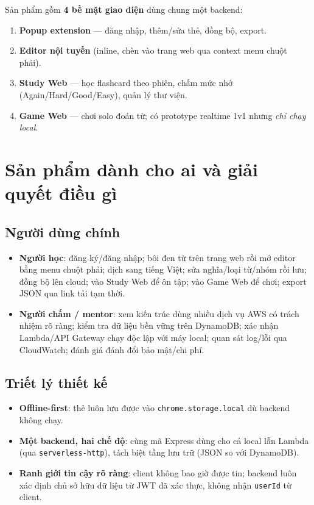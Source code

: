 \documentclass[11pt,a4paper]{article}
\newcommand{\code}[1]{\texttt{#1}}
\begin{document}
\noindent Sản phẩm gồm \textbf{4 bề mặt giao diện} dùng chung một backend:

\begin{enumerate}
  \item \textbf{Popup extension} — đăng nhập, thêm/sửa thẻ, đồng bộ, export.
  \item \textbf{Editor nội tuyến} (inline, chèn vào trang web qua context menu chuột phải).
  \item \textbf{Study Web} — học flashcard theo phiên, chấm mức nhớ (Again/Hard/Good/Easy), quản lý thư viện.
  \item \textbf{Game Web} — chơi solo đoán từ; có prototype realtime 1v1 nhưng \emph{chỉ chạy local}.
\end{enumerate}

\section{Sản phẩm dành cho ai và giải quyết điều gì}

\subsection{Người dùng chính}
\begin{itemize}
  \item \textbf{Người học}: đăng ký/đăng nhập; bôi đen từ trên trang web rồi mở editor bằng
        menu chuột phải; dịch sang tiếng Việt; sửa nghĩa/loại từ/nhóm rồi lưu; đồng bộ lên
        cloud; vào Study Web để ôn tập; vào Game Web để chơi; export JSON qua link tải tạm thời.
  \item \textbf{Người chấm / mentor}: xem kiến trúc dùng nhiều dịch vụ AWS có trách nhiệm rõ ràng;
        kiểm tra dữ liệu bền vững trên DynamoDB; xác nhận Lambda/API Gateway chạy độc lập với máy
        local; quan sát log/lỗi qua CloudWatch; đánh giá đánh đổi bảo mật/chi phí.
\end{itemize}

\subsection{Triết lý thiết kế}
\begin{itemize}
  \item \textbf{Offline-first}: thẻ luôn lưu được vào \code{chrome.storage.local} dù backend không chạy.
  \item \textbf{Một backend, hai chế độ}: cùng mã Express dùng cho cả local lẫn Lambda
        (qua \code{serverless-http}), tách biệt tầng lưu trữ (JSON so với DynamoDB).
  \item \textbf{Ranh giới tin cậy rõ ràng}: client không bao giờ được tin; backend luôn xác định
        chủ sở hữu dữ liệu từ JWT đã xác thực, không nhận \code{userId} từ client.
\end{itemize}
\end{document}

